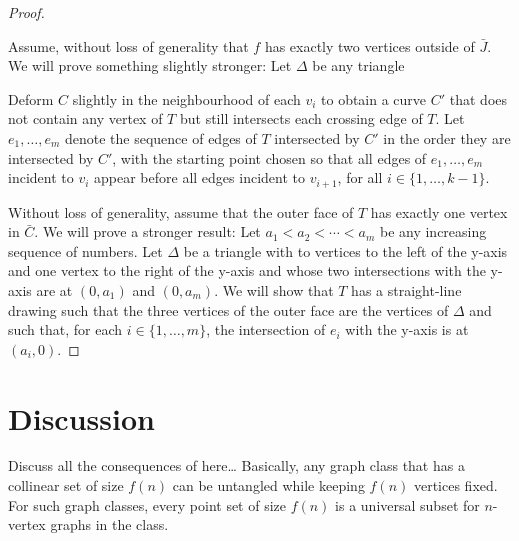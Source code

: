 \documentclass{patmorin}
\begin{document}
\begin{proof}
\begin{enumerate}
   \end{enumerate}

   Assume, without loss of generality that $f$ has exactly two vertices outside of $\bar{J}$.  We will prove something slightly stronger:  Let $\Delta$ be any triangle 

    

   Deform $C$ slightly in the neighbourhood of each $v_i$ to obtain a
   curve $C'$ that does not contain any vertex of $T$ but still intersects
   each crossing edge of $T$.  Let $e_1,\ldots,e_m$ denote the sequence
   of edges of $T$ intersected by $C'$ in the order they are intersected
   by $C'$, with the starting point chosen so that all edges of
   $e_1,\ldots,e_m$ incident to $v_i$ appear before all edges incident to
   $v_{i+1}$, for all $i\in\{1,\ldots,k-1\}$.

   

   

   Without loss of generality, assume that the outer face of $T$ has
   exactly one vertex in $\bar{C}$.  We will prove a stronger result:
   Let $a_1<a_2<\cdots<a_m$ be any increasing sequence of numbers.
   Let $\Delta$ be a triangle with to vertices to the left of the y-axis
   and one vertex to the right of the y-axis and whose two intersections
   with the y-axis are at $(0,a_1)$ and $(0,a_m)$.  We will show that
   $T$ has a straight-line drawing such that the three vertices of
   the outer face are the vertices of $\Delta$ and such that, for each
   $i\in\{1,\ldots,m\}$, the intersection of $e_i$ with the y-axis is
   at $(a_i,0)$.

    
\end{proof}



\section{Discussion}

Discuss all the consequences of  here\ldots
Basically, any graph class that has a collinear set of size $f(n)$ can 
be untangled while keeping $f(n)$ vertices fixed.  For such graph classes,
every point set of size $f(n)$ is a universal subset for $n$-vertex graphs
in the class.
\end{document}
